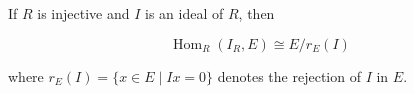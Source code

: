 If $R$ is injective and $I$ is an ideal of $R$, then

$$\operatorname{Hom}_R(I_R, E) \cong E / r_E(I)$$

where $r_E(I) = \{x \in E \mid Ix = 0\}$ denotes the rejection of $I$ in $E$.
